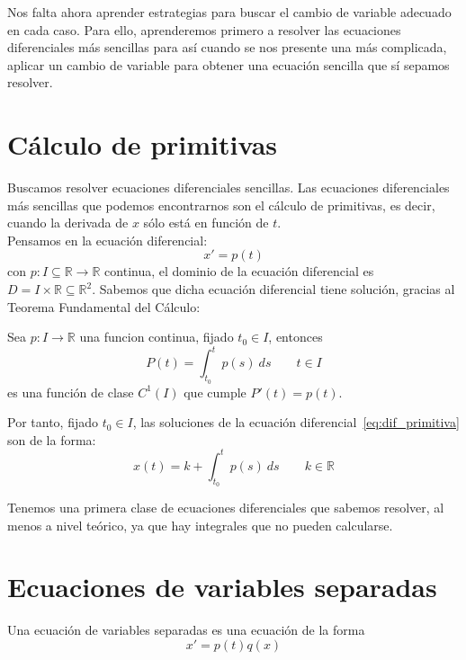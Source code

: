 Nos falta ahora aprender estrategias para buscar el cambio de variable adecuado en cada caso. Para ello, aprenderemos primero a resolver las ecuaciones diferenciales más sencillas para así cuando se nos presente una más complicada, aplicar un cambio de variable para obtener una ecuación sencilla que sí sepamos resolver.

\section{Cálculo de primitivas}
Buscamos resolver ecuaciones diferenciales sencillas. Las ecuaciones diferenciales más sencillas que podemos encontrarnos son el cálculo de primitivas, es decir, cuando la derivada de $x$ sólo está en función de $t$.\\

Pensamos en la ecuación diferencial:
\begin{equation}\label{eq:dif_primitiva}
    x' = p(t)
\end{equation}
con $p:I\subseteq \mathbb{R}\rightarrow\mathbb{R}$ continua, el dominio de la ecuación diferencial es $D = I\times \mathbb{R}\subseteq \mathbb{R}^2$. Sabemos que dicha ecuación diferencial tiene solución, gracias al Teorema Fundamental del Cálculo:

\begin{teo}
    Sea $p:I\rightarrow\mathbb{R}$ una funcion continua, fijado $t_0\in I$, entonces
    \begin{equation*}
        P(t) = \int_{t_0}^{t} p(s)~ds \qquad t\in I
    \end{equation*}
    es una función de clase $C^1(I)$ que cumple $P'(t) = p(t)$.
\end{teo}
Por tanto, fijado $t_0 \in I$, las soluciones de la ecuación diferencial~\ref{eq:dif_primitiva} son de la forma:
\begin{equation*}
    x(t) = k + \int_{t_0}^{t} p(s)~ds  \qquad k\in \mathbb{R}
\end{equation*}

Tenemos una primera clase de ecuaciones diferenciales que sabemos resolver, al menos a nivel teórico, ya que hay integrales que no pueden calcularse.

\section{Ecuaciones de variables separadas}
Una ecuación de variables separadas es una ecuación de la forma
\begin{equation*}
    x' = p(t) q(x)
\end{equation*}

